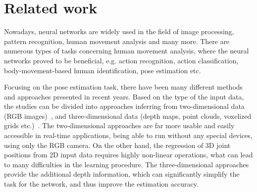 
\chapter{Related work}\label{chap:related work}

Nowadays, neural networks are widely used in the field of image processing, pattern recognition, human movement analysis and many more. There are numerous types of tasks concerning human movement analysis, where the neural networks proved to be beneficial, e.g. action recognition, action classification, body-movement-based human identification, pose estimation etc.\par
\vspace{5mm}
\noindent Focusing on the pose estimation task, there have been many different methods and approaches presented in recent years. Based on the type of the input data, the studies can be divided into approaches inferring from two-dimensional data (RGB images)~\cite{DBLP:journals/corr/ChouCC17,mono-3dhp2017,VNect_SIGGRAPH2017,DBLP:journals/corr/abs-1907-00837,DBLP:journals/corr/NewellYD16,lcrnet,DBLP:journals/corr/abs-1902-09212}, and three-dimensional data (depth maps, point clouds, voxelized grids etc.)~\cite{Ali19,8100085,DBLP:journals/corr/GeLYT16,haque2016viewpoint,10.1016/j.patrec.2013.09.021,DBLP:journals/corr/abs-1711-07399,Shafaei16,5995316,6126310}. The two-dimensional approaches are far more usable and easily accessible in real-time applications, being able to run without any special devices, using only the RGB camera. On the other hand, the regression of 3D joint positions from 2D input data requires highly non-linear operations, what can lead to many difficulties in the learning procedure. The three-dimensional approaches provide the additional depth information, which can significantly simplify the task for the network, and thus improve the estimation accuracy.

